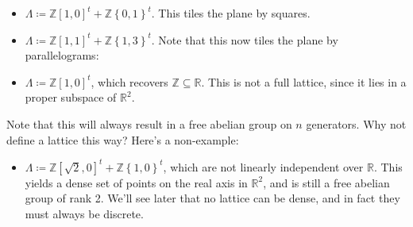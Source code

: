 \begin{example}[$n=2$]

\envlist

\begin{itemize}
\tightlist
\item
  \(\Lambda \coloneqq{\mathbb{Z}}{\left[ {1, 0} \right]}^t + {\mathbb{Z}}\left\{{0, 1}\right\}^t\).
  This tiles the plane by squares.
\item
  \(\Lambda \coloneqq{\mathbb{Z}}{\left[ {1, 1} \right]}^t + {\mathbb{Z}}\left\{{1, 3}\right\}^t\).
  Note that this now tiles the plane by parallelograms:
\end{itemize}

\begin{figure}
\centering
{}
\end{figure}

\begin{itemize}
\tightlist
\item
  \(\Lambda \coloneqq{\mathbb{Z}}{\left[ {1, 0} \right]}^t\), which
  recovers \({\mathbb{Z}}\subseteq {\mathbb{R}}\). This is not a full
  lattice, since it lies in a proper subspace of \({\mathbb{R}}^2\).
\end{itemize}

Note that this will always result in a free abelian group on \(n\)
generators. Why not define a lattice this way? Here's a non-example:

\begin{itemize}
\tightlist
\item
  \(\Lambda \coloneqq{\mathbb{Z}}{\left[ {\sqrt{2} , 0} \right]}^t + {\mathbb{Z}}\left\{{1, 0}\right\}^t\),
  which are not linearly independent over \({\mathbb{R}}\). This yields
  a dense set of points on the real axis in \({\mathbb{R}}^2\), and is
  still a free abelian group of rank 2. We'll see later that no lattice
  can be dense, and in fact they must always be discrete.
\end{itemize}

\end{example}

